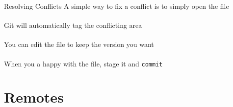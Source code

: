\documentclass{beamer}
\begin{document}
\begin{frame}{Resolving Conflicts}
    A simple way to fix a conflict is to simply open the file \\~\\

    Git will automatically tag the conflicting area \\~\\

    You can edit the file to keep the version you want \\~\\

    When you a happy with the file, stage it and {\tt commit}
\end{frame}

\section{Remotes}
\end{document}
